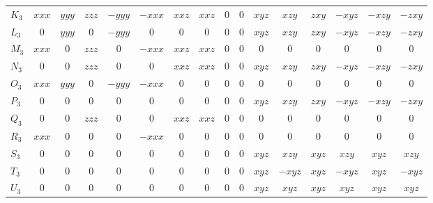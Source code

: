 \documentclass[a4paper,11pt]{article}
\begin{document}
\begin{landscape}
{\begin{tabular}{@{}l c c c c c c c c c c c c c c c@{}}
$K_3$ & $xxx$ & $yyy$ & $zzz$ & $-yyy$ & $-xxx$ & $xxz$ & $xxz$ & $0$ & $0$ & $xyz$ & $xzy$ & $zxy$ & $-xyz$ & $-xzy$ & $-zxy$ \\
$L_3$ & $0$ & $yyy$ & $0$ & $-yyy$ & $0$ & $0$ & $0$ & $0$ & $0$ & $xyz$ & $xzy$ & $zxy$ & $-xyz$ & $-xzy$ & $-zxy$ \\
$M_3$ & $xxx$ & $0$ & $zzz$ & $0$ & $-xxx$ & $xxz$ & $xxz$ & $0$ & $0$ & $0$ & $0$ & $0$ & $0$ & $0$ & $0$ \\
$N_3$ & $0$ & $0$ & $zzz$ & $0$ & $0$ & $xxz$ & $xxz$ & $0$ & $0$ & $xyz$ & $xzy$ & $zxy$ & $-xyz$ & $-xzy$ & $-zxy$ \\
$O_3$ & $xxx$ & $yyy$ & $0$ & $-yyy$ & $-xxx$ & $0$ & $0$ & $0$ & $0$ & $0$ & $0$ & $0$ & $0$ & $0$ & $0$ \\
$P_3$ & $0$ & $0$ & $0$ & $0$ & $0$ & $0$ & $0$ & $0$ & $0$ & $xyz$ & $xzy$ & $zxy$ & $-xyz$ & $-xzy$ & $-zxy$ \\
$Q_3$ & $0$ & $0$ & $zzz$ & $0$ & $0$ & $xxz$ & $xxz$ & $0$ & $0$ & $0$ & $0$ & $0$ & $0$ & $0$ & $0$ \\
$R_3$ & $xxx$ & $0$ & $0$ & $0$ & $-xxx$ & $0$ & $0$ & $0$ & $0$ & $0$ & $0$ & $0$ & $0$ & $0$ & $0$ \\
$S_3$ & $0$ & $0$ & $0$ & $0$ & $0$ & $0$ & $0$ & $0$ & $0$ & $xyz$ & $xzy$ & $xyz$ & $xzy$ & $xyz$ & $xzy$ \\
$T_3$ & $0$ & $0$ & $0$ & $0$ & $0$ & $0$ & $0$ & $0$ & $0$ & $xyz$ & $-xyz$ & $xyz$ & $-xyz$ & $xyz$ & $-xyz$ \\
$U_3$ & $0$ & $0$ & $0$ & $0$ & $0$ & $0$ & $0$ & $0$ & $0$ & $xyz$ & $xyz$ & $xyz$ & $xyz$ & $xyz$ & $xyz$ \\
\bottomrule
\end{tabular}
}
\end{landscape}
\end{document}
